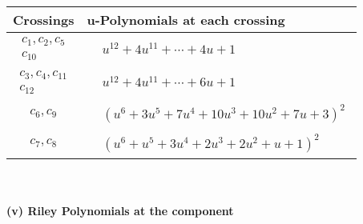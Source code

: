 \documentclass[1p]{elsarticle_modified}
\theoremstyle{definition}
\begin{document}
\begin{tabular}{m{50pt}|m{274pt}}
Crossings & \hspace{64pt}u-Polynomials at each crossing \\
\hline $$\begin{aligned}c_{1},c_{2},c_{5}\\c_{10}\end{aligned}$$&$\begin{aligned}
&u^{12}+4 u^{11}+\cdots+4 u+1
\end{aligned}$\\
\hline $$\begin{aligned}c_{3},c_{4},c_{11}\\c_{12}\end{aligned}$$&$\begin{aligned}
&u^{12}+4 u^{11}+\cdots+6 u+1
\end{aligned}$\\
\hline $$\begin{aligned}c_{6},c_{9}\end{aligned}$$&$\begin{aligned}
&(u^6+3 u^5+7 u^4+10 u^3+10 u^2+7 u+3)^2
\end{aligned}$\\
\hline $$\begin{aligned}c_{7},c_{8}\end{aligned}$$&$\begin{aligned}
&(u^6+u^5+3 u^4+2 u^3+2 u^2+u+1)^2
\end{aligned}$\\
\hline
\end{tabular}\\~\\
\newpage\renewcommand{\arraystretch}{1}
\flushleft \textbf{(v) Riley Polynomials at the component}\newline \\
\end{document}
